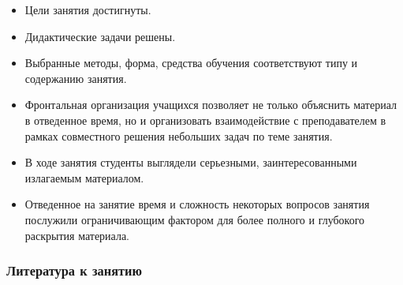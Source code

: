 \documentclass[compress, 9pt]{beamer}
\begin{document}
\begin{refsection}
\begin{frame}
        \begin{itemize}\justifying
            \item Цели занятия достигнуты.
            \item Дидактические задачи решены.
            \item Выбранные методы, форма, средства обучения соответствуют типу и содержанию занятия.
            \item Фронтальная организация учащихся позволяет не только объяснить материал в отведенное время, но и организовать взаимодействие с преподавателем в рамках совместного решения небольших задач по теме занятия.
            \item В ходе занятия студенты выглядели серьезными, заинтересованными излагаемым материалом.
            \item Отведенное на занятие время и сложность некоторых вопросов занятия послужили ограничивающим фактором для более полного и глубокого раскрытия материала.
        \end{itemize}

    \end{frame}

    \begin{frame}\frametitle{Литература к занятию}
        \nocite{*}\printbibliography[heading=none, keyword={lesson1}]
    \end{frame}

    \end{refsection}
\end{document}
